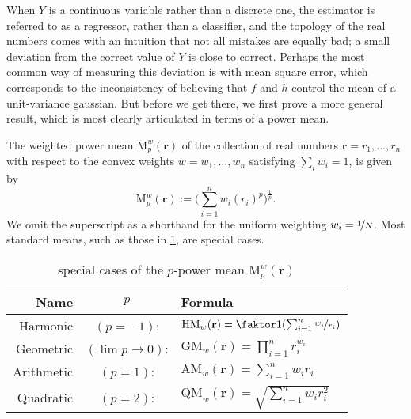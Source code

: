 \documentclass{article}
\theoremstyle{plain}
\newtheorem{prop}[theorem]{Proposition}
\theoremstyle{definition}
\begin{document}


When $Y$ is a continuous variable rather than a discrete one, the estimator is referred to as a regressor, rather than a classifier, and the topology of the real numbers comes with an intuition that not all mistakes are equally bad; a small deviation from the correct value of $Y$ is close to correct. 
Perhaps the most common way of measuring this deviation is with mean square error, which corresponds to the inconsistency of believing that $f$ and $h$ control the mean of a unit-variance gaussian.
But before we get there, we first prove a more general result, which is most clearly articulated in terms of a power mean.

\begin{defn}%
	The weighted power mean $\mathrm M^w_p(\mathbf r)$ of the collection of real numbers $\mathbf r = r_1, \ldots, r_n$ with respect to the convex weights $w = w_1, \ldots, w_n$ satisfying $\sum_iw_i = 1$, is given by
	\[ \mathrm M^w_p(\mathbf r) := \Big(\sum_{i=1}^n w_i (r_i)^p \Big)^{\frac1p}.\]
	We omit the superscript as a shorthand for the uniform weighting $w_i = \nicefrac{1}{N}$.
	Most standard means, such as those in \cref{tab:power-means}, are special cases.
\end{defn}

\begin{table}
\centering
\renewcommand{\arraystretch}{1.5} %
\begin{tabular}{rcl}
	\textbf{Name} & $p$ & \textbf{Formula}\\\hline
	Harmonic&$(p=-1)$:& $\mathrm{HM}_w(\mathbf r) = \faktor1{\left(\sum_{i=1}^n \nicefrac{w_i}{r_i}\right)}$ \\
	Geometric&$(\lim {p\to 0})$:& $\mathrm{GM}_w(\mathbf r) = \prod_{i=1}^n r_i^{w_i}$ \\
	Arithmetic&$(p=1)$:& $\mathrm{AM}_w(\mathbf r) = \sum_{i=1}^n w_i r_i$ \\
	Quadratic&$(p=2)$:& $\mathrm{QM}_w(\mathbf r) = \sqrt{\textstyle\sum_{i=1}^n w_i r_i^2}$\\\hline
	\end{tabular}
	\caption{special cases of the $p$-power mean $\mathrm M_p^w(\mathbf r)$}
	\label{tab:power-means}
\end{table}
\end{document}
